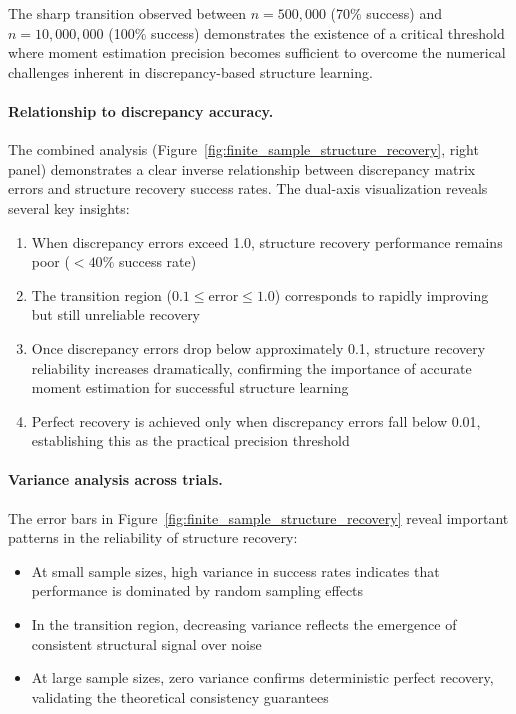 \documentclass[11pt,a4paper]{article}
\numberwithin{equation}{section}
\begin{document}
The sharp transition observed between $n = 500{,}000$ (70\% success) and $n = 10{,}000{,}000$ (100\% success) demonstrates the existence of a critical threshold where moment estimation precision becomes sufficient to overcome the numerical challenges inherent in discrepancy-based structure learning.

\paragraph{Relationship to discrepancy accuracy.} The combined analysis (Figure~\ref{fig:finite_sample_structure_recovery}, right panel) demonstrates a clear inverse relationship between discrepancy matrix errors and structure recovery success rates. The dual-axis visualization reveals several key insights:

\begin{enumerate}[label=(\arabic*)]
\item When discrepancy errors exceed 1.0, structure recovery performance remains poor ($<40\%$ success rate)
\item The transition region ($0.1 \leq \text{error} \leq 1.0$) corresponds to rapidly improving but still unreliable recovery
\item Once discrepancy errors drop below approximately 0.1, structure recovery reliability increases dramatically, confirming the importance of accurate moment estimation for successful structure learning
\item Perfect recovery is achieved only when discrepancy errors fall below 0.01, establishing this as the practical precision threshold
\end{enumerate}

\paragraph{Variance analysis across trials.} The error bars in Figure~\ref{fig:finite_sample_structure_recovery} reveal important patterns in the reliability of structure recovery:

\begin{itemize}
\item At small sample sizes, high variance in success rates indicates that performance is dominated by random sampling effects
\item In the transition region, decreasing variance reflects the emergence of consistent structural signal over noise
\item At large sample sizes, zero variance confirms deterministic perfect recovery, validating the theoretical consistency guarantees
\end{itemize}
\end{document}
